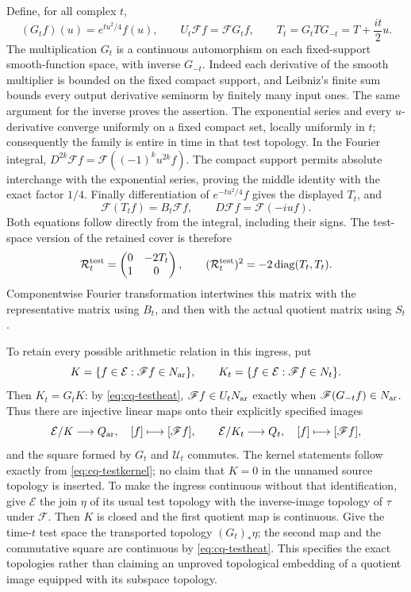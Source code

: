 Define, for all complex $t$,
\begin{equation}\label{eq:cq-testheat}
 (G_tf)(u)=e^{tu^2/4}f(u),\qquad
 U_t\mathscr Ff=\mathscr F G_tf,\qquad
 T_t=G_tTG_{-t}=T+\frac{it}{2}u.
\end{equation}
The multiplication $G_t$ is a continuous automorphism on each
fixed-support smooth-function space, with inverse $G_{-t}$.
Indeed each derivative of the smooth multiplier is bounded on the
fixed compact support, and Leibniz's finite sum bounds every output
derivative seminorm by finitely many input ones. The same argument
for the inverse proves the assertion. The exponential series and
every $u$-derivative converge uniformly on a fixed compact set,
locally uniformly in $t$; consequently the family is entire in time
in that test topology. In the Fourier integral,
$D^{2k}\mathscr Ff=\mathscr F((-1)^ku^{2k}f)$.
The compact support permits absolute interchange with the
exponential series, proving the middle identity with the exact
factor $1/4$. Finally differentiation of $e^{-tu^2/4}f$ gives
the displayed $T_t$, and
\[
 \mathscr F(T_tf)=B_t\mathscr Ff,
 \qquad D\mathscr Ff=\mathscr F(-iu f).
\]
Both equations follow directly from the integral, including their
signs. The test-space version of the retained cover is therefore
\[
 \mathcal R_t^{\rm test}
   =\begin{pmatrix}0&-2T_t\\1&0\end{pmatrix},\qquad
 (\mathcal R_t^{\rm test})^2=-2\operatorname{diag}(T_t,T_t).
\]
Componentwise Fourier transformation intertwines this matrix with
the representative matrix using $B_t$, and then with the actual
quotient matrix using $S_t$.

To retain every possible arithmetic relation in this ingress, put
\begin{equation}\label{eq:cq-testkernel}
 K=\{f\in\mathcal E:\mathscr Ff\in N_{\rm ar}\},\qquad
 K_t=\{f\in\mathcal E:\mathscr Ff\in N_t\}.
\end{equation}
Then $K_t=G_tK$: by \eqref{eq:cq-testheat},
$\mathscr Ff\in U_tN_{\rm ar}$ exactly when
$\mathscr F(G_{-t}f)\in N_{\rm ar}$. Thus there are injective linear
maps onto their explicitly specified images
\[
 \mathcal E/K\longrightarrow Q_{\rm ar},\quad[f]\longmapsto[\mathscr Ff],
 \qquad
 \mathcal E/K_t\longrightarrow Q_t,\quad[f]\longmapsto[\mathscr Ff],
\]
and the square formed by $G_t$ and $\mathcal U_t$ commutes.
The kernel statements follow exactly from
\eqref{eq:cq-testkernel}; no claim that $K=0$ in the unnamed
source topology is inserted. To make the ingress continuous without
that identification, give $\mathcal E$ the join $\eta$ of its
usual test topology with the inverse-image topology of $\tau$
under $\mathscr F$. Then $K$ is closed and the first quotient map
is continuous. Give the time-$t$ test space the transported
topology $(G_t)_*\eta$; the second map and the commutative square
are continuous by \eqref{eq:cq-testheat}. This specifies the exact
topologies rather than claiming an unproved topological embedding
of a quotient image equipped with its subspace topology.

